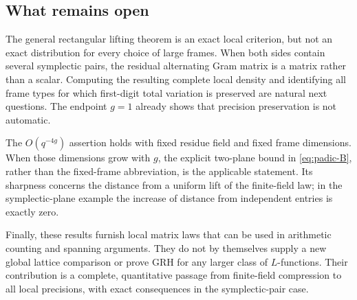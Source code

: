 \subsection{What remains open}

The general rectangular lifting theorem is an exact local criterion,
but not an exact distribution for every choice of large frames.
When both sides contain several symplectic pairs, the residual
alternating Gram matrix is a matrix rather than a scalar. Computing
the resulting complete local density and identifying all frame types
for which first-digit total variation is preserved are natural next
questions. The endpoint $g=1$ already shows that precision preservation
is not automatic.

The $O(q^{-4g})$ assertion holds with fixed residue field and fixed
frame dimensions. When those dimensions grow with $g$, the explicit
two-plane bound in \eqref{eq:padic-B}, rather than the fixed-frame
abbreviation, is the applicable statement. Its sharpness concerns
the distance from a uniform lift of the finite-field law; in the
symplectic-plane example the increase of distance from independent
entries is exactly zero.

Finally, these results furnish local matrix laws that can be used
in arithmetic counting and spanning arguments. They do not by
themselves supply a new global lattice comparison or prove GRH for
any larger class of $L$-functions. Their contribution is a complete,
quantitative passage from finite-field compression to all local
precisions, with exact consequences in the symplectic-pair case.
